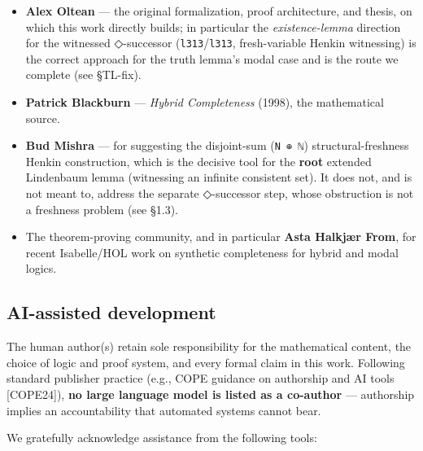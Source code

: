 \documentclass[11pt,a4paper]{article}
\renewcommand{\_}{\origtextunderscore\allowbreak}
\begin{document}
\begin{itemize}
\item
  \textbf{Alex Oltean} --- the original formalization, proof architecture, and thesis, on which this work directly builds; in particular the \emph{existence-lemma} direction for the witnessed ◇-successor (\texttt{l313}/\texttt{l313\textquotesingle{}}, fresh-variable Henkin witnessing) is the correct approach for the truth lemma's modal case and is the route we complete (see §TL-fix).
\item
  \textbf{Patrick Blackburn} --- \emph{Hybrid Completeness} (1998), the mathematical source.
\item
  \textbf{Bud Mishra} --- for suggesting the disjoint-sum (\texttt{N\ ⊕\ ℕ}) structural-freshness Henkin construction, which is the decisive tool for the \textbf{root} extended Lindenbaum lemma (witnessing an infinite consistent set). It does not, and is not meant to, address the separate ◇-successor step, whose obstruction is not a freshness problem (see §1.3).
\item
  The theorem-proving community, and in particular \textbf{Asta Halkjær From}, for recent Isabelle/HOL work on synthetic completeness for hybrid and modal logics.
\end{itemize}

\hypertarget{ai-assisted-development}{%
\subsection{AI-assisted development}\label{ai-assisted-development}}

The human author(s) retain sole responsibility for the mathematical content, the choice of logic and proof system, and every formal claim in this work. Following standard publisher practice (e.g., COPE guidance on authorship and AI tools {[}COPE24{]}), \textbf{no large language model is listed as a co-author} --- authorship implies an accountability that automated systems cannot bear.

We gratefully acknowledge assistance from the following tools:
\end{document}
